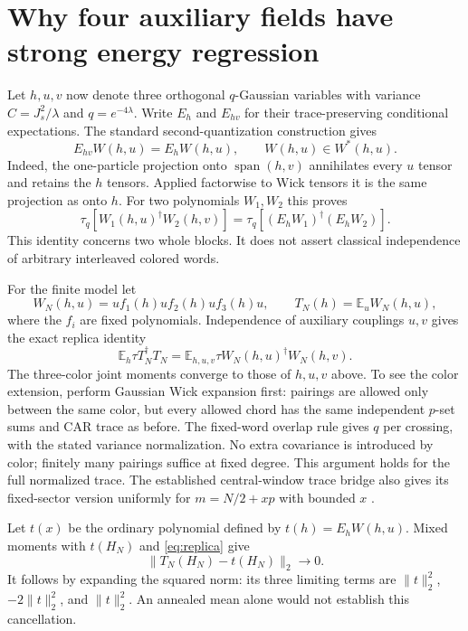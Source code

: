 \documentclass[11pt,a4paper]{article}
\newcommand{\EE}{\mathbb E}
\begin{document}
\newpage
\section{Why four auxiliary fields have strong energy regression}
Let $h,u,v$ now denote three orthogonal $q$-Gaussian variables with
variance $C=J_s^2/\lambda$ and $q=e^{-4\lambda}$. Write $E_h$ and
$E_{hv}$ for their trace-preserving conditional expectations.
The standard second-quantization construction \cite{BKS} gives
\begin{equation}
 E_{hv}W(h,u)=E_hW(h,u),\qquad W(h,u)\in W^*(h,u).
 \label{eq:square}
\end{equation}
Indeed, the one-particle projection onto $\operatorname{span}(h,v)$
annihilates every $u$ tensor and retains the $h$ tensors. Applied
factorwise to Wick tensors it is the same projection as onto $h$.
For two polynomials $W_1,W_2$ this proves
\begin{equation}
 \tau_q[W_1(h,u)^\dagger W_2(h,v)]
 =\tau_q[(E_hW_1)^\dagger(E_hW_2)].
 \label{eq:replica}
\end{equation}
This identity concerns two whole blocks. It does not assert
classical independence of arbitrary interleaved colored words.

For the finite model let
\begin{equation}
 W_N(h,u)=u f_1(h)u f_2(h)u f_3(h)u,\qquad
 T_N(h)=\EE_u W_N(h,u),
\end{equation}
where the $f_i$ are fixed polynomials. Independence of auxiliary
couplings $u,v$ gives the exact replica identity
\begin{equation}
 \EE_h\tau T_N^\dagger T_N
 =\EE_{h,u,v}\tau W_N(h,u)^\dagger W_N(h,v).
\end{equation}
The three-color joint moments converge to those of $h,u,v$ above.
To see the color extension, perform Gaussian Wick expansion first:
pairings are allowed only between the same color, but every allowed
chord has the same independent $p$-set sums and CAR trace as before.
The fixed-word overlap rule \cite{BNR,Tall} gives $q$ per crossing,
with the stated variance normalization. No extra covariance is
introduced by color; finitely many pairings suffice at fixed degree.
This argument holds for the full normalized trace. The established
central-window trace bridge also gives its fixed-sector version
uniformly for $m=N/2+xp$ with bounded $x$ \cite{Central}.

Let $t(x)$ be the ordinary polynomial defined by $t(h)=E_hW(h,u)$.
Mixed moments with $t(H_N)$ and \eqref{eq:replica} give
\begin{equation}
 \boxed{\quad\|T_N(H_N)-t(H_N)\|_2\longrightarrow0.\quad}
 \label{eq:polynomial}
\end{equation}
It follows by expanding the squared norm: its three limiting terms
are $\|t\|_2^2$, $-2\|t\|_2^2$, and $\|t\|_2^2$.
An annealed mean alone would not establish this cancellation.
\end{document}
